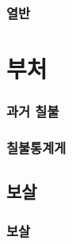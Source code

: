 \documentclass[12pt, a4paper, oneside]{book}
\let\stdsection\section
\renewcommand\section{\newpage\stdsection}
\begin{document}
%										
	\section{ 	열반	}							




	\part{ 부처 }
	\noptcrule
	\parttoc				

%
	\section{  과거 칠불 }



%					
	\section{ 	칠불통계게	}		




	\chapter{ 보살 }
	\noptcrule

	\newpage	
	\minitoc



%
	\section{ 보살 }


%
\end{document}
